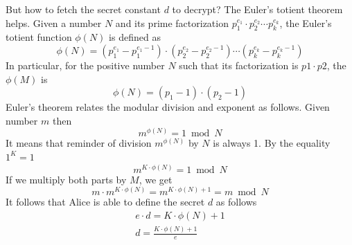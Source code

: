 \documentclass[12pt,letterpaper,oneside,reqno]{amsart}
\begin{document}
    But how to fetch the secret constant $d$ to decrypt?
    The Euler's totient theorem helps.
    Given a number $N$ and its prime factorization $p_1^{e_1}\cdot p_2^{e_2} \cdots p_k^{e_k}$, the Euler's totient function
    $\phi(N)$ is defined as
    \[
        \phi(N) = (p_1^{e_1} - p_1^{e_1 - 1}) \cdot (p_2^{e_2} - p_2^{e_2 - 1}) \cdots (p_k^{e_k} - p_k^{e_k - 1})
    \]
    In particular, for the positive number $N$ such that its factorization is $p1 \cdot p2$, the $\phi(M)$ is
    \[
        \phi(N) = (p_1 -1) \cdot (p_2 - 1)
    \]
    Euler's theorem relates the modular division and exponent as follows.
    Given number $m$ then
    \[
        m^{\phi(N)} = 1 \bmod N
    \]
    It means that reminder of division $m^{\phi(N)}$ by $N$ is always 1.
    By the equality $1^K = 1$
    \[
        m^{K \cdot \phi(N)} = 1 \bmod N
    \]
    If we multiply both parts by $M$, we get
    \[
        m \cdot m^{K \cdot \phi(N)} = m^{K \cdot \phi(N) + 1} = m \bmod N
    \]
    It follows that Alice is able to define the secret $d$ as follows
    \begin{gather*}
        e \cdot d = K \cdot \phi(N) + 1\\
        d = \frac{K \cdot \phi(N) + 1}{e}\\
    \end{gather*}
\end{document}
